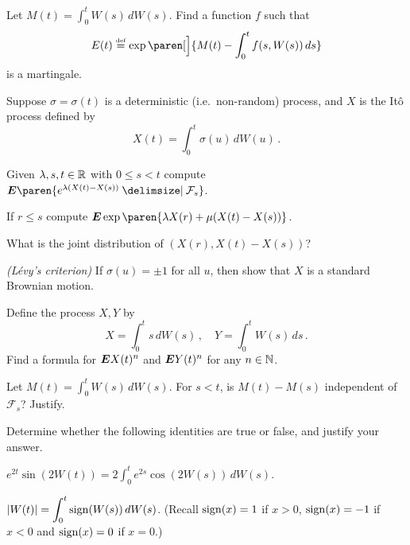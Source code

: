 \begin{problem}
  Let $\displaystyle M(t) = \int_0^t W(s) \, dW(s)$.
  Find a function $f$ such that
  \begin{equation*}
    E(t) \defeq \exp\paren[\Big]{ M(t) - \int_0^t f(s, W(s)) \, ds }
  \end{equation*}
  is a martingale.
\end{problem}
\begin{problem}
  Suppose $\sigma = \sigma(t)$ is a deterministic (i.e.\ non-random) process, and $X$ is the It\^o process defined by
  \begin{equation*}
    X(t) = \int_0^t \sigma(u) \, dW(u)\,.
  \end{equation*}
  \vspace{-.7\baselineskip}
  \begin{parts}
    \item
      Given $\lambda, s, t \in \mathbb{R}$ with $0 \leq s < t$ compute $\E \paren{ e^{\lambda (X(t) - X(s))} \given \mathcal F_s}$.

    \item
      If $r \leq s$ compute $\E \exp\paren{\lambda X(r) + \mu(X(t) - X(s))}$.

    \item
      What is the joint distribution of $(X(r), X(t) - X(s))$?

    \item
      \emph{(L\'evy's criterion)}
      If $\sigma(u) = \pm 1$ for all $u$, then show that $X$ is a standard Brownian motion.
  \end{parts}
\end{problem}
\begin{problem}
  Define the process $X, Y$ by
  \begin{equation*}
    X = \int_0^t s \, dW(s)\,,
    \quad
    Y = \int_0^t W(s) \, ds\,.
  \end{equation*}
  Find a formula for $\bm{E} X(t)^n$ and $\bm{E} Y(t)^n$ for any $n \in \mathbb{N}$.
\end{problem}
\begin{problem}
  Let $\displaystyle M(t) = \int_0^t W(s) \, dW(s)$.
  For $s < t$, is $M(t) - M(s)$ independent of $\mathcal F_s$?
  Justify.
\end{problem}

\begin{problem}
  Determine whether the following identities are true or false, and justify your answer.
  \begin{parts}
    \item
      $\displaystyle e^{2t} \sin(2 W(t)) = 2 \int_0^t e^{2s} \cos(2 W(s)) \, dW(s)$.

    \item
      $\displaystyle \lvert W(t)\rvert = \int_0^t \operatorname{sign}(W(s)) \, dW(s)$.
      (Recall $\operatorname{sign}(x) = 1$ if $x > 0$, $\operatorname{sign}(x) = -1$ if $x < 0$ and $\operatorname{sign}(x) = 0$ if $x = 0$.)
  \end{parts}
\end{problem}
